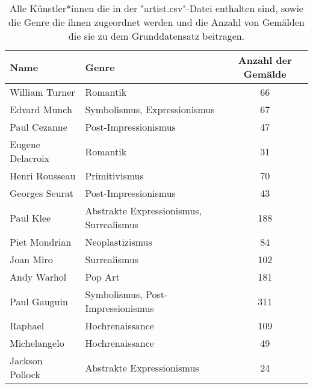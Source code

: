 \begin{table}
    \centering
    \caption{Alle Künstler*innen die in der "artist.csv"-Datei enthalten sind, sowie die Genre die ihnen zugeordnet werden und die Anzahl von Gemälden die sie zu dem Grunddatensatz beitragen.}
    \begin{tabular}{l l c}
        \toprule
        Name & Genre & Anzahl der Gemälde \\
        \midrule
        William Turner      &   Romantik & 66        \\
        Edvard Munch          &   Symbolismus, Expressionismus   & 67      \\
        Paul Cezanne          &   Post-Impressionismus  & 47      \\
        Eugene Delacroix      &   Romantik & 31      \\
        Henri Rousseau      &   Primitivismus & 70        \\
        Georges Seurat      &   Post-Impressionismus  & 43        \\
        Paul Klee         &   Abstrakte Expressionismus, Surrealismus   & 188       \\
        Piet Mondrian        &   Neoplastizismus   & 84       \\
        Joan Miro         &   Surrealismus  & 102     \\
        Andy Warhol       &   Pop Art & 181     \\
        Paul Gauguin          &   Symbolismus, Post-Impressionismus  & 311      \\
        Raphael          &   Hochrenaissance   & 109      \\
        Michelangelo          &   Hochrenaissance   & 49      \\
        Jackson Pollock    &   Abstrakte Expressionismus  & 24     \\
        \bottomrule
    \end{tabular}
    \label{tab:artist}
\end{table}